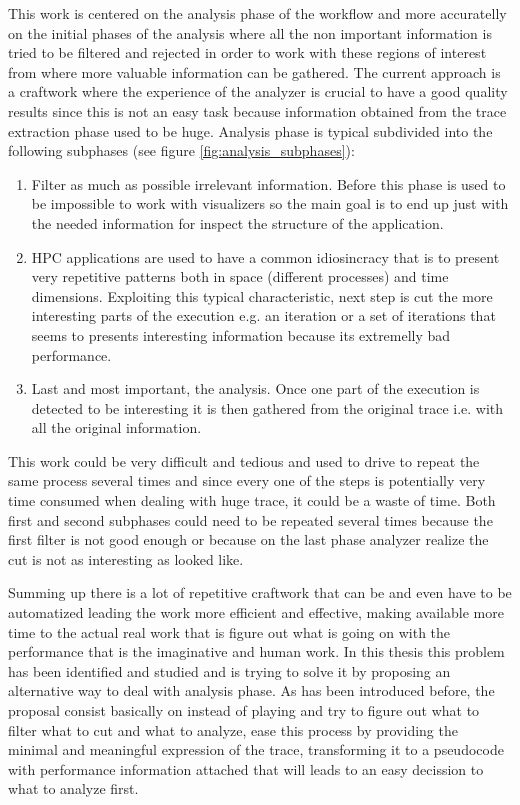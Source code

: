 This work is centered on the analysis phase of the workflow and more accuratelly on
the initial phases of the analysis where all the non important information is
tried to be filtered and rejected in order to work with these regions of
interest from where more valuable information can be gathered. The current
approach is  a craftwork where the experience of the analyzer is crucial to have
a good quality results since this is not an easy task because information 
obtained from the trace extraction phase used to be huge. Analysis phase is
typical subdivided into the following subphases (see figure
\ref{fig:analysis_subphases}):
\begin{enumerate}[label=\roman*)]
  \item Filter as much as possible irrelevant information. Before this phase is
    used to be impossible to work with visualizers so the main goal is to end up
    just with the needed information for inspect the structure of the
    application.
  \item HPC applications are used to have a common idiosincracy that is to
    present very repetitive patterns both in space (different processes) and 
    time dimensions. Exploiting this typical characteristic, next step is cut
    the more interesting parts of the execution e.g. an iteration or a set of
    iterations that seems to presents interesting information because its 
    extremelly bad performance.
  \item Last and most important, the analysis. Once one part of the execution is
    detected to be interesting it is then gathered from the original trace i.e.
    with all the original information.
\end{enumerate}
This work could be very difficult and tedious and used to drive to repeat the
same process several times and since every one of the steps is potentially very 
time consumed when dealing with huge trace, it could be a waste of time. Both first and second subphases could need to be repeated
several times because the first filter is not good enough or because on the last
phase analyzer realize the cut is not as interesting as looked like.

Summing up there is a lot of repetitive craftwork that can be and even have to
be automatized leading the work more efficient and effective, making available
more time to the actual real work that is figure out what is going on with the
performance that is the imaginative and human work. In this thesis this problem
has been identified and studied and is trying to solve it by proposing
an alternative way to deal with analysis phase. As has been introduced before, 
the proposal consist basically 
on instead of playing and try to figure out what to filter what to cut and what
to analyze, ease this process by providing the minimal and meaningful expression
of the trace, transforming it to a pseudocode with performance information 
attached that will leads to an easy decission to what to analyze first.
